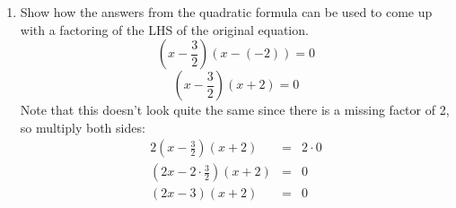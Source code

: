 \documentclass[letterpaper,12pt,fleqn]{article}
\begin{document}
\begin{enumerate}
\begin{enumerate}
  \item Show how the answers from the quadratic formula can be used to come up
    with a factoring of the LHS of the original equation.
    \[\left(x-\frac{3}{2}\right)(x-(-2))=0\]
    \[\left(x-\frac{3}{2}\right)(x+2)=0\]
    Note that this doesn't look quite the same since there is a missing factor
    of 2, so multiply both sides:
    \begin{eqnarray*}
      2\left(x-\frac{3}{2}\right)(x+2) &=& 2\cdot0 \\
      \left(2x-2\cdot\frac{3}{2}\right)(x+2) &=& 0 \\
      (2x-3)(x+2) &=& 0 \\
    \end{eqnarray*}
  \end{enumerate}
\end{enumerate}
  
\end{document}
